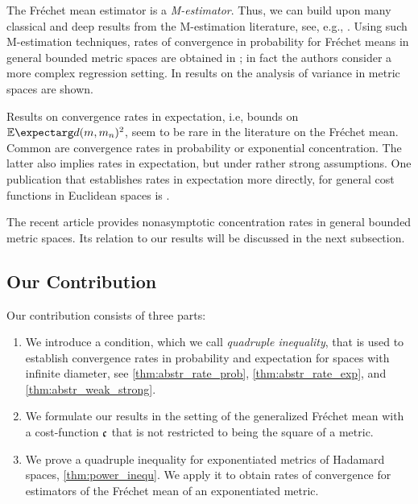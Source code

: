 The Fréchet mean estimator is a \textit{M-estimator}. Thus, we can build upon many classical and deep results from the M-estimation literature, see, e.g., \cite{vaart96, geer00, talagrand14}.
Using such  M-estimation techniques, rates of convergence in probability for Fréchet means in general bounded metric spaces are obtained in \cite{petersen16}; in fact the authors  consider a more complex regression setting. In \cite{dubey17} results on the analysis of variance in metric spaces are shown. 

Results on convergence rates in expectation, i.e, bounds on $\Ex{d(m,m_n)^2}$, seem to be rare in the literature on the Fréchet mean. Common are convergence rates in probability or exponential concentration. The latter also implies rates in expectation, but under rather strong assumptions. One publication that establishes rates in expectation more directly, for general cost functions in Euclidean spaces is \cite{banholzer17}.

The recent article \cite{legouic18} provides nonasymptotic concentration rates in general bounded metric spaces. Its relation to our results will be discussed in the next subsection.

\subsection{Our Contribution}

Our contribution consists of three parts:
\begin{enumerate}[label=(\alph*)]
\item 
We introduce a condition, which we call \textit{quadruple inequality}, that is used to establish convergence rates in probability and expectation for spaces with infinite diameter, see \autoref{thm:abstr_rate_prob}, \autoref{thm:abstr_rate_exp}, and \autoref{thm:abstr_weak_strong}.
\item 
We formulate our results in the setting of the generalized Fréchet mean with a cost-function $\mathfrak{c}$ that is not restricted to being the square of a metric.
\item 
We prove a quadruple inequality for exponentiated metrics of Hadamard spaces, \autoref{thm:power_inequ}. We apply it to obtain rates of convergence for estimators of the Fréchet mean of an exponentiated metric.
\end{enumerate}

